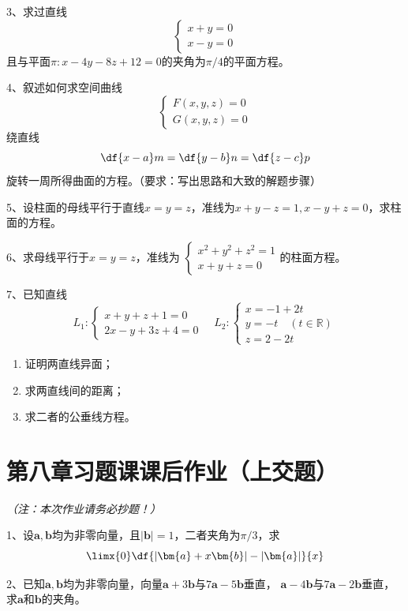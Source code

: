 3、求过直线
$$\left\{\begin{array}{l}
	x+y=0\\
	x-y=0
\end{array}\right.$$
且与平面$\pi:x-4y-8z+12=0$的夹角为$\pi/4$的平面方程。

4、叙述如何求空间曲线$$\left\{\begin{array}{l}
F(x,y,z)=0\\ G(x,y,z)=0
\end{array}\right.$$绕直线
$$\df{x-a}m=\df{y-b}n=\df{z-c}p$$
旋转一周所得曲面的方程。（要求：写出思路和大致的解题步骤）

5、设柱面的母线平行于直线$x=y=z$，准线为$x+y-z=1,x-y+z=0$，求柱面的方程。

6、求母线平行于$x=y=z$，准线为
$\left\{\begin{array}{l}
	x^2+y^2+z^2=1\\ x+y+z=0
\end{array}\right.$的柱面方程。

7、已知直线
$$L_1:\left\{\begin{array}{l}
	x+y+z+1=0\\
	2x-y+3z+4=0
\end{array}\right.
\quad
L_2:\left\{\begin{array}{l}
	x=-1+2t\\
	y=-t\quad(t\in\mathbb{R})\\
	z=2-2t
\end{array}\right.
$$
\begin{enumerate}[(1)]
  \setlength{\itemindent}{1cm}
  \item 证明两直线异面；
  \item 求两直线间的距离；
  \item 求二者的公垂线方程。
\end{enumerate}

\ifvisible

\newpage

\section*{第八章习题课课后作业（上交题）}

{\it （注：本次作业请务必抄题！）}

\bigskip

1、设$\bm{a},\bm{b}$均为非零向量，且$|\bm{b}|=1$，二者夹角为$\pi/3$，求
$$\limx{0}\df{|\bm{a}+x\bm{b}|-|\bm{a}|}{x}$$

2、已知$\bm{a},\bm{b}$均为非零向量，向量$\bm{a}+3\bm{b}$与$7\bm{a}-5\bm{b}$垂直，
$\bm{a}-4\bm{b}$与$7\bm{a}-2\bm{b}$垂直，求$\bm{a}$和$\bm{b}$的夹角。

